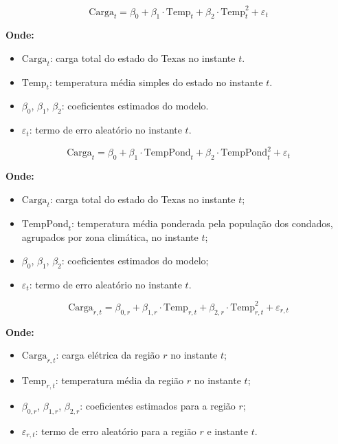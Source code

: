 \documentclass{article}
\begin{document}
\begin{equation}
    \text{Carga}_t = \beta_0 + \beta_1 \cdot \text{Temp}_t + \beta_2 \cdot \text{Temp}_t^2 + \varepsilon_t
    \end{equation}
    
    \begin{flushleft}
    \textbf{Onde:}
    \begin{itemize}
        \item $\text{Carga}_t$: carga total do estado do Texas no instante $t$.
        \item $\text{Temp}_t$: temperatura média simples do estado no instante $t$.
        \item $\beta_0$, $\beta_1$, $\beta_2$: coeficientes estimados do modelo.
        \item $\varepsilon_t$: termo de erro aleatório no instante $t$.
    \end{itemize}
    \end{flushleft}


\begin{equation}
    \text{Carga}_{t} = \beta_0 + \beta_1 \cdot \text{TempPond}_{t} + \beta_2 \cdot \text{TempPond}_{t}^2 + \varepsilon_t
    \end{equation}
    
    \begin{flushleft}
    \textbf{Onde:}
    \begin{itemize}
        \item $\text{Carga}_{t}$: carga total do estado do Texas no instante $t$;
        \item $\text{TempPond}_{t}$: temperatura média ponderada pela população dos condados, agrupados por zona climática, no instante $t$;
        \item $\beta_0$, $\beta_1$, $\beta_2$: coeficientes estimados do modelo;
        \item $\varepsilon_t$: termo de erro aleatório no instante $t$.
    \end{itemize}
    \end{flushleft}


\begin{equation}
    \text{Carga}_{r,t} = \beta_{0,r} + \beta_{1,r} \cdot \text{Temp}_{r,t} + \beta_{2,r} \cdot \text{Temp}_{r,t}^2 + \varepsilon_{r,t}
    \end{equation}
    
    \begin{flushleft}
    \textbf{Onde:}
    \begin{itemize}
        \item $\text{Carga}_{r,t}$: carga elétrica da região $r$ no instante $t$;
        \item $\text{Temp}_{r,t}$: temperatura média da região $r$ no instante $t$;
        \item $\beta_{0,r}$, $\beta_{1,r}$, $\beta_{2,r}$: coeficientes estimados para a região $r$;
        \item $\varepsilon_{r,t}$: termo de erro aleatório para a região $r$ e instante $t$.
    \end{itemize}
    \end{flushleft}
\end{document}

